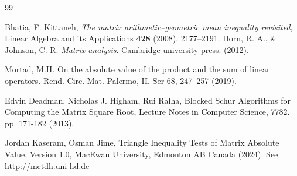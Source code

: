 \begin{thebibliography}{99}

    Bhatia, F. Kittaneh, {\em The matrix arithmetic–geometric mean inequality revisited}, Linear Algebra and its Applications {\bf 428} (2008), 2177–2191.
    Horn, R. A., \& Johnson, C. R.  \textit{Matrix analysis}. Cambridge university press. (2012).

    Mortad, M.H. On the absolute value of the product and the sum of linear operators. Rend. Circ. Mat. Palermo, II. Ser 68, 247–257 (2019).

    Edvin Deadman, Nicholas J. Higham, Rui Ralha, Blocked Schur Algorithms for Computing the Matrix Square Root, Lecture Notes in Computer Science, 7782. pp. 171-182 (2013).

    Jordan Kaseram, Osman Jime, Triangle Inequality Tests of Matrix Absolute Value, Version 1.0, MacEwan University, Edmonton AB Canada (2024). See http://mctdh.uni-hd.de


\end{thebibliography}